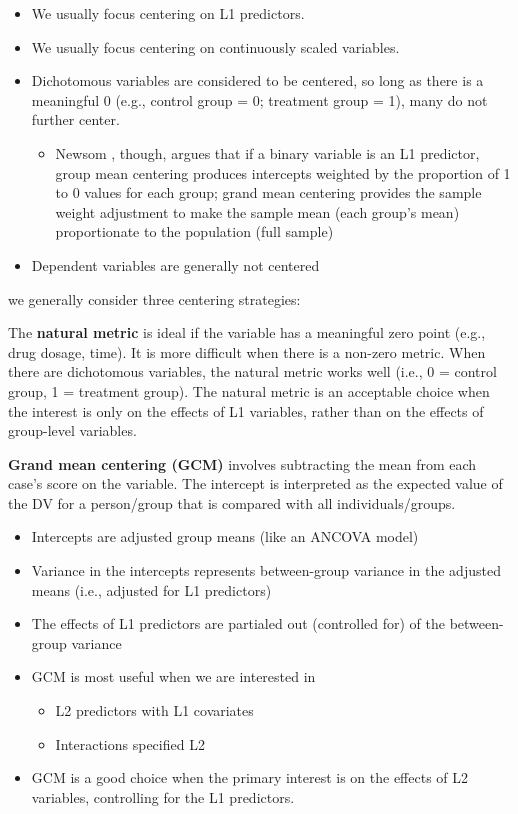 \documentclass[
  english,
]{book}
\providecommand{\tightlist}{%
  \setlength{\itemsep}{0pt}\setlength{\parskip}{0pt}}
\begin{document}
\begin{itemize}
\tightlist
\item
  We usually focus centering on L1 predictors.
\item
  We usually focus centering on continuously scaled variables.
\item
  Dichotomous variables are considered to be centered, so long as there is a meaningful 0 (e.g., control group = 0; treatment group = 1), many do not further center.

  \begin{itemize}
  \tightlist
  \item
    Newsom \citeyearpar{newsom_centering_2019}, though, argues that if a binary variable is an L1 predictor, group mean centering produces intercepts weighted by the proportion of 1 to 0 values for each group; grand mean centering provides the sample weight adjustment to make the sample mean (each group's mean) proportionate to the population (full sample)
  \end{itemize}
\item
  Dependent variables are generally not centered
\end{itemize}

we generally consider three centering strategies:

The \textbf{natural metric} is ideal if the variable has a meaningful zero point (e.g., drug dosage, time). It is more difficult when there is a non-zero metric. When there are dichotomous variables, the natural metric works well (i.e., 0 = control group, 1 = treatment group). The natural metric is an acceptable choice when the interest is only on the effects of L1 variables, rather than on the effects of group-level variables.

\textbf{Grand mean centering (GCM)} involves subtracting the mean from each case's score on the variable. The intercept is interpreted as the expected value of the DV for a person/group that is compared with all individuals/groups.

\begin{itemize}
\tightlist
\item
  Intercepts are adjusted group means (like an ANCOVA model)
\item
  Variance in the intercepts represents between-group variance in the adjusted means (i.e., adjusted for L1 predictors)
\item
  The effects of L1 predictors are partialed out (controlled for) of the between-group variance
\item
  GCM is most useful when we are interested in

  \begin{itemize}
  \tightlist
  \item
    L2 predictors with L1 covariates
  \item
    Interactions specified L2
  \end{itemize}
\item
  GCM is a good choice when the primary interest is on the effects of L2 variables, controlling for the L1 predictors.
\end{itemize}
\end{document}
